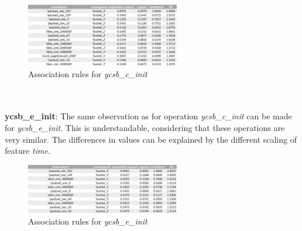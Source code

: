 \begin{figure}[h]
      \centering
      \includegraphics[width=0.6\textwidth]{images/pr_c_init.png}
      \caption{Association rules for \textit{ycsb\_c\_init}}
      \label{fig:pr_c_init}
\end{figure}
\\\\
\textbf{ycsb\_e\_init}:
The same observation as for operation \textit{ycsb\_c\_init} can be made for \textit{ycsb\_e\_init}. This is understandable, considering that these operations are very similar. The differences in values can be explained by the different scaling of feature \textit{time}. 
\begin{figure}[h]
      \centering
      \includegraphics[width=0.6\textwidth]{images/pr_e_init.png}
      \caption{Association rules for \textit{ycsb\_e\_init}}
      \label{fig:pr_e_init}
\end{figure}


